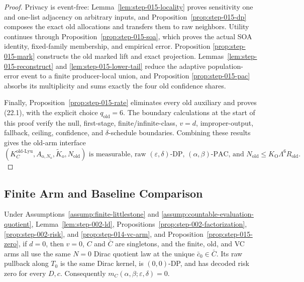 \begin{proof}
Privacy is event-free: Lemma~\ref{lem:step-015-locality} proves
sensitivity one and one-list adjacency on arbitrary inputs, and
Proposition~\ref{prop:step-015-dp} composes the exact old allocations and
transfers them to raw neighbors. Utility continues through
Proposition~\ref{prop:step-015-soa}, which proves the actual SOA identity,
fixed-family membership, and empirical error. Proposition
\ref{prop:step-015-mark} constructs the old marked lift and exact
projection. Lemmas~\ref{lem:step-015-reconstruct} and
\ref{lem:step-015-lower-tail} reduce the adaptive population-error event to
a finite producer-local union, and Proposition
\ref{prop:step-015-pac} absorbs its multiplicity and sums exactly the four
old confidence shares.

Finally, Proposition~\ref{prop:step-015-rate} eliminates every old
auxiliary and proves (22.1), with the explicit choice
\(q_{\mathrm{old}}=6\). The boundary calculations at the start of this
proof verify the null, first-stage,
finite/infinite-class, \(v=d\), improper-output, fallback, ceiling,
confidence, and \(\delta\)-schedule boundaries. Combining these results
gives the old-arm interface
\[
\boxed{
(K_C^{\mathrm{old\text{-}Lyu}},
A_{\mathrm o,N_{\mathrm o}},
\widetilde K_{\mathrm o},
N_{\mathrm{old}})
\text{ is measurable, raw }(\varepsilon,\delta)\text{-DP, }
(\alpha,\beta)\text{-PAC, and }
N_{\mathrm{old}}\le K_{\mathrm O}\Lambda^6R_{\mathrm{old}}.}
\]



\end{proof}

\subsection{Finite Arm and Baseline Comparison}\label{app:step_016}


 \begin{proposition}\label{prop:step-016-zero}
Under Assumptions~\ref{assump:finite-littlestone} and
\ref{assump:countable-evaluation-quotient}, Lemma~\ref{lem:step-002-ld}, 
Propositions~\ref{prop:step-002-factorization},
\ref{prop:step-002-risk}, and
\ref{prop:step-014-vc-arm}, and Proposition~\ref{prop:step-015-zero}, if \(d=0\), then \(v=0\),
\(C\) and \(\bar C\) are singletons, and the finite, old, and VC arms all
use the same \(N=0\) Dirac quotient law at the unique
\(\bar c_0\in\bar C\). Its raw pullback along \(T_0\) is the same Dirac
kernel, is \((0,0)\)-DP, and has decoded risk zero for every \(D,c\).
Consequently \(m_C(\alpha,\beta;\varepsilon,\delta)=0\).


\end{proposition}

